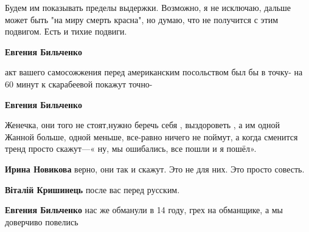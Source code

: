 \begin{itemize}
\begin{itemize}
Будем им показывать пределы выдержки. Возможно, я не исключаю, дальше может
быть "на миру смерть красна", но думаю, что не получится с этим подвигом. Есть
и тихие подвиги.


 
\textbf{Евгения Бильченко} 

акт вашего самосожжения перед американским посольством был бы в точку- на 60
минут к скарабеевой покажут точно-

 
\textbf{Евгения Бильченко} 

Женечка, они того не стоят,нужно беречь себя , выздороветь , а им одной Жанной
больше, одной меньше, все-равно ничего не поймут, а когда сменится тренд просто
скажут—« ну, мы ошибались, все пошли и я пошёл».

 
\textbf{Ирина Новикова} верно, они так и скажут. Это не для них. Это просто совесть.

 
\textbf{Віталій Кришинець} после вас перед русским.

 
\textbf{Евгения Бильченко} нас же обманули в 14 году, грех на обманщике, а мы доверчиво повелись


\end{itemize}
\end{itemize}

